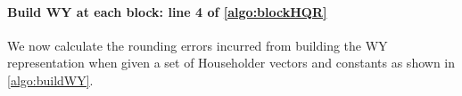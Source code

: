 \paragraph{Build WY at each block: line 4 of \cref{algo:blockHQR}}
We now calculate the rounding errors incurred from building the WY representation when given a set of Householder vectors and constants as shown in \cref{algo:buildWY}.
